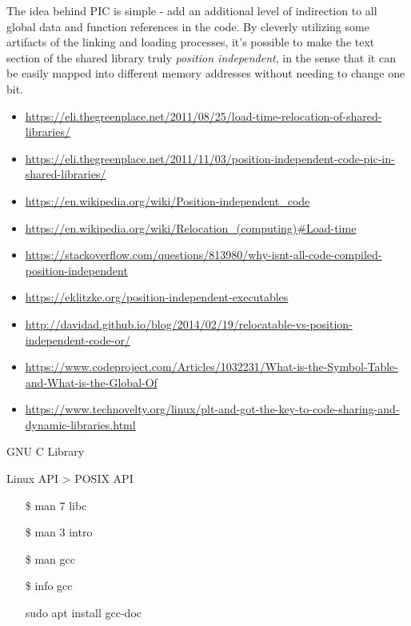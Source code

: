 \begin{description}
  The idea behind PIC is simple - add an additional level of indirection to all global
  data and function references in the code. By cleverly utilizing some artifacts of the
  linking and loading processes, it's possible to make the text section of the shared
  library truly \emph{position independent}, in the sense that it can be easily mapped
  into different memory addresses without needing to change one bit.
  \begin{itemize}
  \item
    \url{https://eli.thegreenplace.net/2011/08/25/load-time-relocation-of-shared-libraries/}
  \item
    \url{https://eli.thegreenplace.net/2011/11/03/position-independent-code-pic-in-shared-libraries/}
  \item \url{https://en.wikipedia.org/wiki/Position-independent_code}
  \item \url{https://en.wikipedia.org/wiki/Relocation_(computing)#Load-time}
  \item
    \url{https://stackoverflow.com/questions/813980/why-isnt-all-code-compiled-position-independent}
  \item \url{https://eklitzke.org/position-independent-executables}
  \item
    \url{http://davidad.github.io/blog/2014/02/19/relocatable-vs-position-independent-code-or/}
  \item
    \url{https://www.codeproject.com/Articles/1032231/What-is-the-Symbol-Table-and-What-is-the-Global-Of}
  \item \url{https://www.technovelty.org/linux/plt-and-got-the-key-to-code-sharing-and-dynamic-libraries.html}
  \end{itemize}
\end{description}

\begin{frame}{GNU C Library}
  \begin{minipage}{.55\linewidth}
    Linux API > POSIX API
    \ttfamily
    \begin{itemize}
    \item[\$] man 7 libc
    \item[\$] man 3 intro
    \item[\$] man gcc
    \item[\$] info gcc
    \item[\debian] sudo apt install gcc-doc
    \end{itemize}
  \end{minipage}
  \begin{minipage}{.4\linewidth}
    \begin{center}
    \end{center}
  \end{minipage}
\end{frame}

